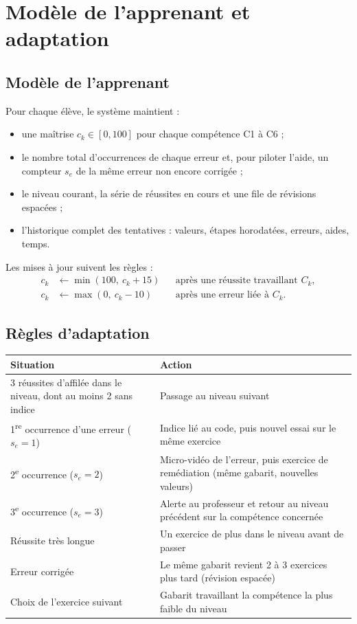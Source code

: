 \documentclass[11pt,a4paper]{report}
\begin{document}
\chapter{Modèle de l'apprenant et adaptation}\label{ch:adapt}

\section{Modèle de l'apprenant}
Pour chaque élève, le système maintient :
\begin{itemize}
  \item une maîtrise $c_k \in [0, 100]$ pour chaque compétence C1 à C6 ;
  \item le nombre total d'occurrences de chaque erreur et, pour piloter l'aide, un compteur $s_e$ de la même erreur non encore corrigée ;
  \item le niveau courant, la série de réussites en cours et une file de révisions espacées ;
  \item l'historique complet des tentatives : valeurs, étapes horodatées, erreurs, aides, temps.
\end{itemize}
Les mises à jour suivent les règles :
\begin{align}
  c_k &\leftarrow \min(100,\ c_k + 15) && \text{après une réussite travaillant } C_k,\\
  c_k &\leftarrow \max(0,\ c_k - 10) && \text{après une erreur liée à } C_k.
\end{align}

\section{Règles d'adaptation}
\begin{center}
\small
\begin{tabularx}{\textwidth}{>{\raggedright}p{5.5cm} X}
  \toprule
  Situation & Action \\
  \midrule
  3 réussites d'affilée dans le niveau, dont au moins 2 sans indice & Passage au niveau suivant \\
  1\textsuperscript{re} occurrence d'une erreur ($s_e = 1$) & Indice lié au code, puis nouvel essai sur le même exercice \\
  2\textsuperscript{e} occurrence ($s_e = 2$) & Micro-vidéo de l'erreur, puis exercice de remédiation (même gabarit, nouvelles valeurs) \\
  3\textsuperscript{e} occurrence ($s_e = 3$) & Alerte au professeur et retour au niveau précédent sur la compétence concernée \\
  Réussite très longue & Un exercice de plus dans le niveau avant de passer \\
  Erreur corrigée & Le même gabarit revient 2 à 3 exercices plus tard (révision espacée) \\
  Choix de l'exercice suivant & Gabarit travaillant la compétence la plus faible du niveau \\
  \bottomrule
\end{tabularx}
\end{center}
\end{document}
